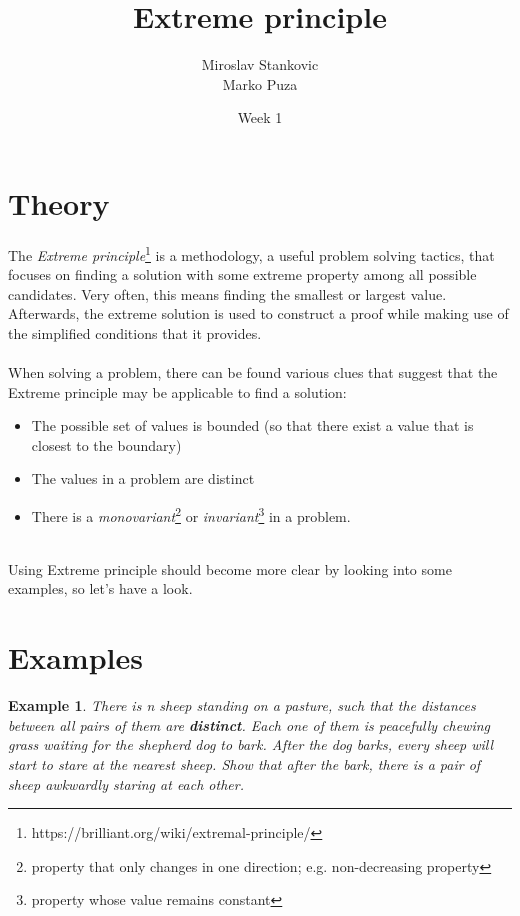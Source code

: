 \documentclass[12pt]{article}
\title{\textbf{Extreme principle}}
\date{Week 1}
\author{Miroslav Stankovic\\ Marko Puza}
\newtheorem{theorem}{Example}
\begin{document}
\maketitle

\section{Theory}

The \emph{Extreme principle}\footnote{https://brilliant.org/wiki/extremal-principle/} is a methodology, a useful problem solving tactics, that focuses on finding a solution with some extreme property among all possible candidates. Very often, this means finding the smallest or largest value. Afterwards, the extreme solution is used to construct a proof while making use of the simplified conditions that it provides.
\\\\
When solving a problem, there can be found various clues that suggest that the Extreme principle may be applicable to find a solution:
\begin{itemize}
	\item{The possible set of values is bounded (so that there exist 	a value that is closest to the boundary)}
	\item{The values in a problem are distinct}
	\item{There is a \emph{monovariant}\footnote{property that only changes in one direction; e.g. non-decreasing property} or \emph{invariant}\footnote{property whose value remains constant} in a problem.}
\end{itemize}


\noindent \\ Using Extreme principle should become more clear by looking into some examples, so let's have a look. 

\section{Examples}

\begin{theorem}
There is n sheep standing on a pasture, such that the distances between all pairs of them are \textbf{distinct}. Each one of them is peacefully chewing grass waiting for the shepherd dog to bark. After the dog barks, every sheep will start to stare at the nearest sheep. Show that after the bark, there is a pair of sheep awkwardly staring at each other. 
\end{theorem}
\end{document}
